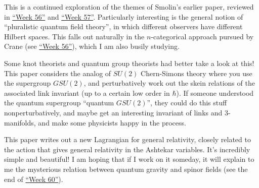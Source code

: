 \documentclass{article}
\def\tightlist{}
\renewcommand{\texttt}[1]{%
  \begingroup
  \ttfamily
  \begingroup\lccode`~=`/\lowercase{\endgroup\def~}{/\discretionary{}{}{}}%
  \begingroup\lccode`~=`[\lowercase{\endgroup\def~}{[\discretionary{}{}{}}%
  \begingroup\lccode`~=`.\lowercase{\endgroup\def~}{.\discretionary{}{}{}}%
  \catcode`/=\active\catcode`[=\active\catcode`.=\active
  \scantokens{#1\noexpand}%
  \endgroup
}
\begin{document}
This is a continued exploration of the themes of Smolin's earlier paper,
reviewed in \protect\hyperlink{week56}{``Week 56''} and
\protect\hyperlink{week57}{``Week 57''}. Particularly interesting is the
general notion of ``pluralistic quantum field theory'', in which
different observers have different Hilbert spaces. This falls out
naturally in the \(n\)-categorical approach pursued by Crane (see
\protect\hyperlink{week56}{``Week 56''}), which I am also busily
studying.


Some knot theorists and quantum group theorists had better take a look
at this! This paper considers the analog of \(SU(2)\) Chern-Simons
theory where you use the supergroup \(GSU(2)\), and perturbatively work
out the skein relations of the associated link invariant (up to a
certain low order in \(\hbar\)). If someone understood the quantum
supergroup ``quantum \(GSU(2)\)'', they could do this stuff
nonperturbatively, and maybe get an interesting invariant of links and
3-manifolds, and make some physicists happy in the process.


This paper writes out a new Lagrangian for general relativity, closely
related to the action that gives general relativity in the Ashtekar
variables. It's incredibly simple and beautiful! I am hoping that if I
work on it someday, it will explain to me the mysterious relation
between quantum gravity and spinor fields (see the end of
\protect\hyperlink{week60}{``Week 60''}).

\end{document}
